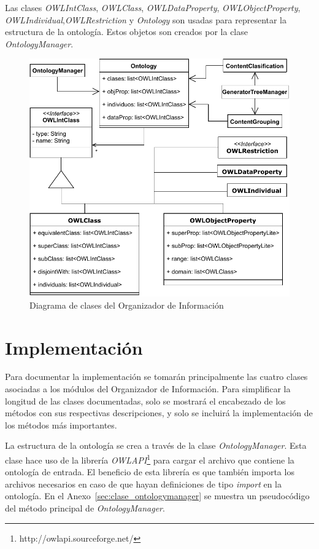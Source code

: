 Las clases \emph{OWLIntClass},  \emph{OWLClass},  \emph{OWLDataProperty},  \emph{OWLObjectProperty}, \emph{OWLIndividual},\emph{OWLRestriction} y  \emph{Ontology} son usadas para representar la estructura de la ontología. Estos objetos son creados por la clase  \emph{OntologyManager}. 

\begin{figure}
    \centering
    \includegraphics{img/organizacion_informacion/diagrama_clases_organizador_informacion.pdf}
    \caption{Diagrama de clases del Organizador de Información}
    \label{fig:diagrama_clases_organizador}
\end{figure}

\section{Implementación}
Para documentar la implementación se tomarán principalmente las cuatro clases asociadas a los módulos del Organizador de Información. Para simplificar la longitud de las clases documentadas, solo se mostrará el encabezado de los métodos con sus respectivas descripciones, y solo se incluirá la implementación de los métodos más importantes.

La estructura de la ontología se crea a través de la clase \emph{OntologyManager}. Esta clase hace uso de la librería  \emph{OWLAPI}\footnote{http://owlapi.sourceforge.net/} para cargar el archivo que contiene la ontología de entrada. El beneficio de esta librería es que también importa los archivos necesarios en caso de que hayan definiciones de tipo \emph{import} en la ontología. En el Anexo~\ref{sec:clase_ontologymanager} se muestra un pseudocódigo del método principal de \emph{OntologyManager}.

